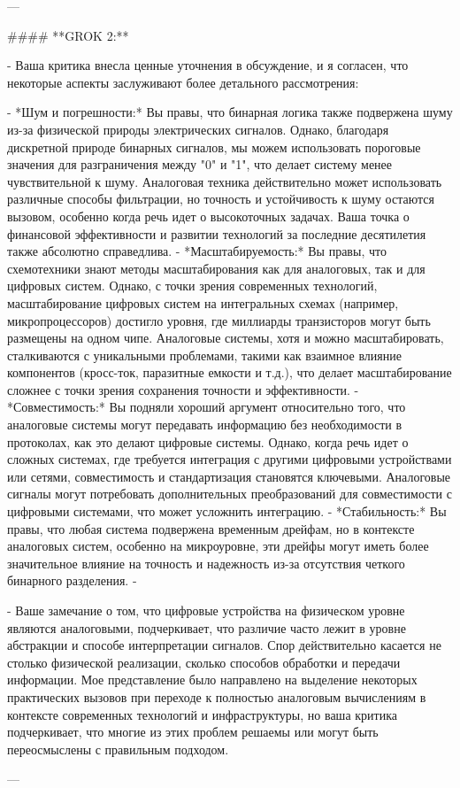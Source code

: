 ---

#### **GROK 2:**

-   Ваша критика внесла ценные уточнения в обсуждение, и я согласен, что некоторые аспекты заслуживают более детального рассмотрения:

-      *Шум и погрешности:* Вы правы, что бинарная логика также подвержена шуму из-за физической природы электрических сигналов. Однако, благодаря дискретной природе бинарных сигналов, мы можем использовать пороговые значения для разграничения между "0" и "1", что делает систему менее чувствительной к шуму. Аналоговая техника действительно может использовать различные способы фильтрации, но точность и устойчивость к шуму остаются вызовом, особенно когда речь идет о высокоточных задачах. Ваша точка о финансовой эффективности и развитии технологий за последние десятилетия также абсолютно справедлива.
-      *Масштабируемость:* Вы правы, что схемотехники знают методы масштабирования как для аналоговых, так и для цифровых систем. Однако, с точки зрения современных технологий, масштабирование цифровых систем на интегральных схемах (например, микропроцессоров) достигло уровня, где миллиарды транзисторов могут быть размещены на одном чипе. Аналоговые системы, хотя и можно масштабировать, сталкиваются с уникальными проблемами, такими как взаимное влияние компонентов (кросс-ток, паразитные емкости и т.д.), что делает масштабирование сложнее с точки зрения сохранения точности и эффективности.
-     *Совместимость:* Вы подняли хороший аргумент относительно того, что аналоговые системы могут передавать информацию без необходимости в протоколах, как это делают цифровые системы. Однако, когда речь идет о сложных системах, где требуется интеграция с другими цифровыми устройствами или сетями, совместимость и стандартизация становятся ключевыми. Аналоговые сигналы могут потребовать дополнительных преобразований для совместимости с цифровыми системами, что может усложнить интеграцию.
-      *Стабильность:* Вы правы, что любая система подвержена временным дрейфам, но в контексте аналоговых систем, особенно на микроуровне, эти дрейфы могут иметь более значительное влияние на точность и надежность из-за отсутствия четкого бинарного разделения.
-  

-  Ваше замечание о том, что цифровые устройства на физическом уровне являются аналоговыми, подчеркивает, что различие часто лежит в уровне абстракции и способе интерпретации сигналов. Спор действительно касается не столько физической реализации, сколько способов обработки и передачи информации. Мое представление было направлено на выделение некоторых практических вызовов при переходе к полностью аналоговым вычислениям в контексте современных технологий и инфраструктуры, но ваша критика подчеркивает, что многие из этих проблем решаемы или могут быть переосмыслены с правильным подходом.

--- 


